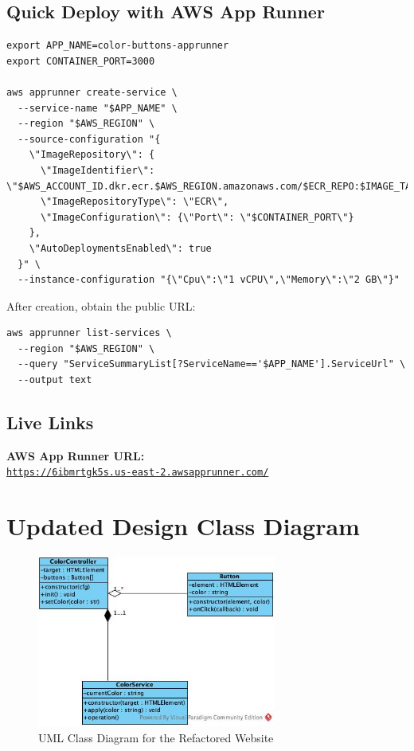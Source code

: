 \subsection{Quick Deploy with AWS App Runner}
\begin{verbatim}
export APP_NAME=color-buttons-apprunner
export CONTAINER_PORT=3000

aws apprunner create-service \
  --service-name "$APP_NAME" \
  --region "$AWS_REGION" \
  --source-configuration "{
    \"ImageRepository\": {
      \"ImageIdentifier\": \"$AWS_ACCOUNT_ID.dkr.ecr.$AWS_REGION.amazonaws.com/$ECR_REPO:$IMAGE_TAG\",
      \"ImageRepositoryType\": \"ECR\",
      \"ImageConfiguration\": {\"Port\": \"$CONTAINER_PORT\"}
    },
    \"AutoDeploymentsEnabled\": true
  }" \
  --instance-configuration "{\"Cpu\":\"1 vCPU\",\"Memory\":\"2 GB\"}"
\end{verbatim}

\noindent After creation, obtain the public URL:
\begin{verbatim}
aws apprunner list-services \
  --region "$AWS_REGION" \
  --query "ServiceSummaryList[?ServiceName=='$APP_NAME'].ServiceUrl" \
  --output text
\end{verbatim}

\subsection{Live Links}

\noindent \textbf{AWS App Runner URL:}\\
\href{https://6ibmrtgk5s.us-east-2.awsapprunner.com/}{\texttt{https://6ibmrtgk5s.us-east-2.awsapprunner.com/}}


\section{Updated Design Class Diagram}
\begin{figure}[h]
  \centering
  \includegraphics[width=0.7\textwidth]{png/colorButtonPage.jpg}
  \caption{UML Class Diagram for the Refactored Website}
  \label{fig:colorPageClassDiagram}
\end{figure}

